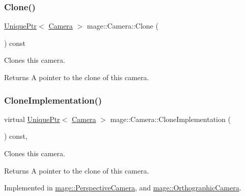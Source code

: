 \subsubsection{\texorpdfstring{Clone()}{Clone()}}
{\footnotesize\ttfamily \hyperlink{namespacemage_a3316d7143a973e37adf1110f2e80ca31}{Unique\+Ptr}$<$ \hyperlink{classmage_1_1_camera}{Camera} $>$ mage\+::\+Camera\+::\+Clone (\begin{DoxyParamCaption}{ }\end{DoxyParamCaption}) const}

Clones this camera.

\begin{DoxyReturn}{Returns}
A pointer to the clone of this camera. 
\end{DoxyReturn}
\hypertarget{classmage_1_1_camera_aedf6e7d6ee6c6e9e82da814ef8e705ab}{}\label{classmage_1_1_camera_aedf6e7d6ee6c6e9e82da814ef8e705ab} 
\subsubsection{\texorpdfstring{Clone\+Implementation()}{CloneImplementation()}}
{\footnotesize\ttfamily virtual \hyperlink{namespacemage_a3316d7143a973e37adf1110f2e80ca31}{Unique\+Ptr}$<$ \hyperlink{classmage_1_1_camera}{Camera} $>$ mage\+::\+Camera\+::\+Clone\+Implementation (\begin{DoxyParamCaption}{ }\end{DoxyParamCaption}) const\hspace{0.3cm}{\ttfamily [private]}, {}}

Clones this camera.

\begin{DoxyReturn}{Returns}
A pointer to the clone of this camera. 
\end{DoxyReturn}


Implemented in \hyperlink{classmage_1_1_perspective_camera_aa597ab884256b7e6fad63653af3ac789}{mage\+::\+Perspective\+Camera}, and \hyperlink{classmage_1_1_orthographic_camera_aeef89cff8f4272b1412fa3ce366e656d}{mage\+::\+Orthographic\+Camera}.

\hypertarget{classmage_1_1_camera_a1e58333595c327f78b2c1b83dd2c3645}{}\label{classmage_1_1_camera_a1e58333595c327f78b2c1b83dd2c3645} 
